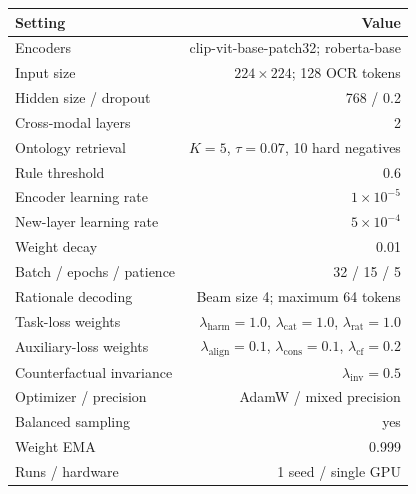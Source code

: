 \begin{tabular}{lr}
\toprule
\textbf{Setting} & \textbf{Value} \\
\midrule
Encoders & clip-vit-base-patch32; roberta-base \\
Input size & $224\times224$; 128 OCR tokens \\
Hidden size / dropout & 768 / 0.2 \\
Cross-modal layers & 2 \\
Ontology retrieval & $K=5$, $\tau=0.07$, 10 hard negatives \\
Rule threshold & 0.6 \\
Encoder learning rate & $1\times10^{-5}$ \\
New-layer learning rate & $5\times10^{-4}$ \\
Weight decay & 0.01 \\
Batch / epochs / patience & 32 / 15 / 5 \\
Rationale decoding & Beam size 4; maximum 64 tokens \\
Task-loss weights & $\lambda_{\mathrm{harm}}=1.0$, $\lambda_{\mathrm{cat}}=1.0$, $\lambda_{\mathrm{rat}}=1.0$ \\
Auxiliary-loss weights & $\lambda_{\mathrm{align}}=0.1$, $\lambda_{\mathrm{cons}}=0.1$, $\lambda_{\mathrm{cf}}=0.2$ \\
Counterfactual invariance & $\lambda_{\mathrm{inv}}=0.5$ \\
Optimizer / precision & AdamW / mixed precision \\
Balanced sampling & yes \\
Weight EMA & 0.999 \\
Runs / hardware & 1 seed / single GPU \\
\bottomrule
\end{tabular}
